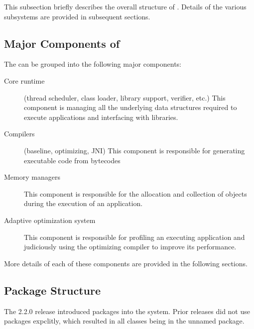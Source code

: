 This subsection briefly describes the overall structure of \jrvm.
Details of the various subsystems are provided in subsequent
sections. 

\subsection{Major Components of \jrvm}


The \jrvm can be grouped into the following major components:
\begin{description}
\item [Core runtime] (thread scheduler, class loader, library support,
verifier, etc.) This component is managing all the underlying data
structures required to execute applications and interfacing with
libraries.

\item [Compilers] (baseline, optimizing, JNI) This component is
responsible for generating executable code from bytecodes

\item [Memory managers] This component is responsible for the
allocation and collection of objects during the execution of an
application. 

\item [Adaptive optimization system] This component is responsible
for profiling an executing application
and judiciously using the optimizing compiler to
improve its performance.
\end{description}

More details of each of these components are provided in the following sections.

\subsection{Package Structure}
The 2.2.0 release introduced packages into the system.  Prior releases
did not use packages expclitly, which resulted in all classes being in
the unnamed package.  

